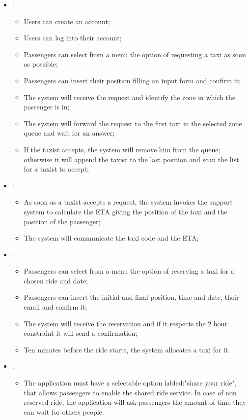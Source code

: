 \begin {itemize}
\item [G1]:
	\begin{itemize}
	\item Users can create an account;
	\item Users can log into their account;
	\item Passengers can select from a menu the option of requesting a taxi as soon as possible; 
	\item Passengers can insert their position filling an input form and confirm it;
	\item The system will receive the request and identify the zone in which the passenger is in;
	\item The system will forward the request to the first taxi in the selected zone queue and wait for an answer;
	\item If the taxist accepts, the system will remove him from the queue; otherwise it will append the taxist to the last position and
scan the list for a taxist to accept;
	\end{itemize}
\item [G2]:
	\begin{itemize}
	\item As soon as a taxist accepts a request, the system invokes the support system to calculate the ETA giving the position of the taxi and the position of the passenger;
	\item The system will communicate the taxi code and the ETA;
	\end{itemize}
\item [G3]:
	\begin{itemize}
	\item Passengers can select from a menu the option of reserving a taxi for a chosen ride and date; 
	\item Passengers can insert the initial and final position, time and date, their email and confirm it;
	\item The system will receive the reservation and if it respects the 2 hour constraint it will send a confirmation;
	\item Ten minutes before the ride starts, the system allocates a taxi for it.
	\end{itemize}
\item [G4]:
	\begin{itemize}
	\item The application must have a selectable option labled:"share your ride", that allows passengers to enable the shared ride service. In case of non reserved ride, the application will ask passengers the amount of time they can wait for others people.

\end{itemize}
\end{itemize}
